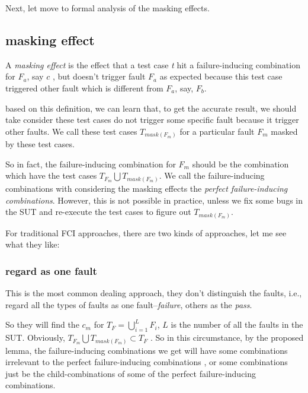 \documentclass{sig-alternate}
\begin{document}

Next, let move to formal analysis of the masking effects.

\subsection{masking effect}

\begin{definition}
A \emph{masking effect} is the effect that a test case \emph{t} hit a failure-inducing combination for $F_{a}$, say $c$ , but doesn't trigger fault $F_{a}$ as expected because this test case triggered other fault which is different from $F_{a}$, say, $F_{b}$.

\end{definition}

based on this definition, we can learn that, to get the accurate result, we should take consider these test cases do not trigger some specific fault because it trigger other faults. We call these test cases $T_{mask(F_{m})}$ for a particular fault $F_{m}$ masked by these test cases.

So in fact, the failure-inducing combination for $F_{m}$ should be the combination which have the test cases $T_{F_{m}} \bigcup T_{mask(F_{m})}$. We call the failure-inducing combinations with considering the masking effects the \emph{perfect failure-inducing combinations}. However, this is not possible in practice, unless we fix some bugs in the SUT and re-execute the test cases to figure out $T_{mask(F_{m})}$.

For traditional FCI approaches, there are two kinds of approaches, let me see what they like:

\subsubsection{regard as one fault}
This is the most common dealing approach, they don't distinguish the faults, i.e., regard all the types of faults as one fault--\emph{failure}, others as the \emph{pass}.

So they will find the $c_{m}$ for $T_{F} = \bigcup_{i = 1}^{L}F_{i}$, $L$ is the number of all the faults in the SUT. Obviously, $T_{F_{m}} \bigcup T_{mask(F_{m})} \subset T_{F}$ . So in this circumstance, by the proposed lemma, the failure-inducing combinations we get will have some combinations irrelevant to the perfect failure-inducing combinations , or some combinations just be the child-combinations of some of the perfect failure-inducing combinations.
\end{document}
